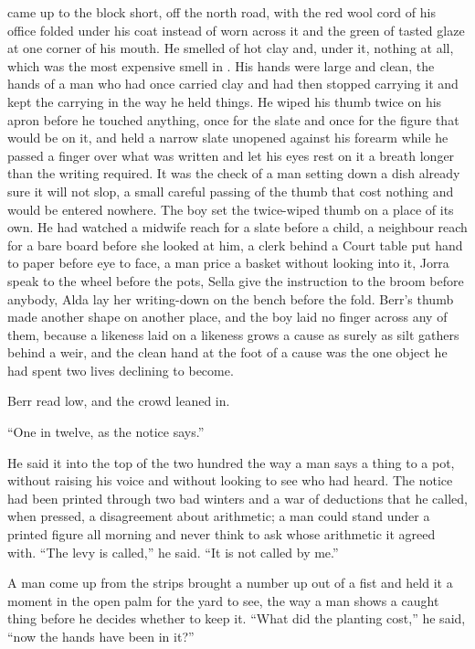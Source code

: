  came up to the block short, off the north road, with the red wool cord of his office folded under his coat instead of worn across it and the green of tasted glaze at one corner of his mouth. He smelled of hot clay and, under it, nothing at all, which was the most expensive smell in . His hands were large and clean, the hands of a man who had once carried clay and had then stopped carrying it and kept the carrying in the way he held things. He wiped his thumb twice on his apron before he touched anything, once for the slate and once for the figure that would be on it, and held a narrow slate unopened against his forearm while he passed a finger over what was written and let his eyes rest on it a breath longer than the writing required. It was the check of a man setting down a dish already sure it will not slop, a small careful passing of the thumb that cost nothing and would be entered nowhere. The boy set the twice-wiped thumb on a place of its own. He had watched a midwife reach for a slate before a child, a neighbour reach for a bare board before she looked at him, a clerk behind a Court table put hand to paper before eye to face, a man price a basket without looking into it, Jorra speak to the wheel before the pots, Sella give the instruction to the broom before anybody, Alda lay her writing-down on the bench before the fold. Berr's thumb made another shape on another place, and the boy laid no finger across any of them, because a likeness laid on a likeness grows a cause as surely as silt gathers behind a weir, and the clean hand at the foot of a cause was the one object he had spent two lives declining to become.

Berr read low, and the crowd leaned in.

“One in twelve, as the notice says.”

He said it into the top of the two hundred the way a man says a thing to a pot, without raising his voice and without looking to see who had heard. The notice had been printed through two bad winters and a war of deductions that he called, when pressed, a disagreement about arithmetic; a man could stand under a printed figure all morning and never think to ask whose arithmetic it agreed with. “The levy is called,” he said. “It is not called by me.”

A man come up from the strips brought a number up out of a fist and held it a moment in the open palm for the yard to see, the way a man shows a caught thing before he decides whether to keep it. “What did the planting cost,” he said, “now the hands have been in it?”

